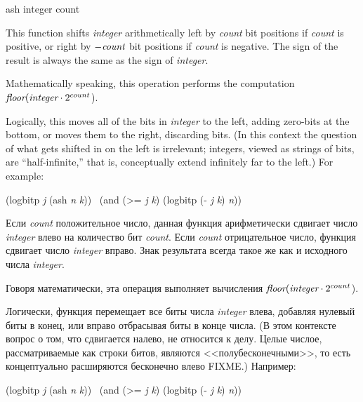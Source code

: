 \begin{defun}[Function]
ash integer count

This function shifts \emph{integer} arithmetically left by \emph{count} bit
positions if \emph{count} is positive,
or right by $-\emph{count}$ bit positions if \emph{count} is negative.
The sign of the result is always the same as the sign of \emph{integer}.

Mathematically speaking, this operation performs the computation
$\emph{floor}(\emph{integer}\cdot2^{count}$).

Logically, this moves all of the bits in \emph{integer} to the left,
adding zero-bits at the bottom, or moves them to the right,
discarding bits.  (In this context the question of what gets shifted
in on the left is irrelevant; integers, viewed as strings of bits,
are ``half-infinite,'' that is, conceptually extend infinitely far to the left.)
For example:
\begin{lisp}
(logbitp \emph{j} (ash \emph{n} \emph{k})) \EQ\ (and (>= \emph{j} \emph{k}) (logbitp (- \emph{j} \emph{k}) \emph{n}))
\end{lisp}

Если \emph{count} положительное число, данная функция арифметически сдвигает
число \emph{integer} влево на количество бит \emph{count}. Если \emph{count}
отрицательное число, функция сдвигает число \emph{integer} вправо.  
Знак результата всегда такое же как и исходного числа \emph{integer}.

Говоря математически, эта операция выполняет вычисления
$\emph{floor}(\emph{integer}\cdot2^{count}$).

Логически, функция перемещает все биты числа \emph{integer} влева, добавляя
нулевый биты в конец, или вправо отбрасывая биты в конце числа. (В этом
контексте вопрос о том, что сдвигается налево, не относится к делу. Целые
числое, рассматриваемые как строки битов, являются <<полубесконечными>>,
то есть концептуально расширяются бесконечно влево FIXME.)
Например:
\begin{lisp}
(logbitp \emph{j} (ash \emph{n} \emph{k})) \EQ\ (and (>= \emph{j} \emph{k}) (logbitp (- \emph{j} \emph{k}) \emph{n}))
\end{lisp}
\end{defun}

